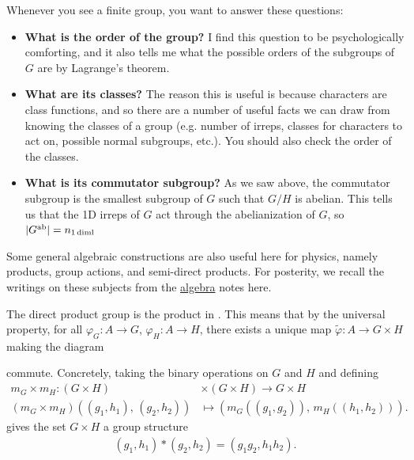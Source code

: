 \documentclass[11pt]{article}
\begin{document}
\begin{iidea}
    Whenever you see a finite group, you want to answer these questions:
    \begin{itemize}
        \item \textbf{What is the order of the group?} I find this question to be 
        psychologically comforting, and it also tells me what the possible 
        orders of the subgroups of $G$ are by Lagrange's theorem.
        \item \textbf{What are its classes?} The reason this is useful is because
        characters are class functions, and so there are a number of useful facts we can
        draw from knowing the classes of a group (e.g. number of irreps,
        classes for characters to act on, possible normal subgroups, etc.).
        You should also check the order of the classes.
        \item \textbf{What is its commutator subgroup?} As we saw above, the commutator
        subgroup is the smallest subgroup of $G$ such that $G/H$ is abelian.
        This tells us that the 1D irreps of $G$ act through the abelianization 
        of $G$, so $|G^{\rm ab}| = n_{1 \, \rm{diml}}$
    \end{itemize}
\end{iidea}

Some general algebraic constructions are also useful here
for physics, namely products, group actions, and semi-direct products.
For posterity, we recall the writings on these subjects from the 
\href{https://github.com/will-lancer/notes/blob/main/Mathematics/coreMath/coreMath.pdf}{algebra} 
notes here.

The direct product group is the product in . This means that by 
the universal property, for all $\varphi_G \colon A \to G$, $\varphi_{H} \colon A \to H$,
there exists a unique map $\widetilde{\varphi} \colon A \to G \times H$
making the diagram

\begin{center}
\end{center}

\noin
commute. Concretely, taking the binary operations on $G$
and $H$ and defining 
\begin{align*}
    m_G \times m_H \colon (G \times H) & \times (G \times H) \to G \times H\\
    (m_G \times m_H)((g_1, h_1), \, (g_2, h_2)) & \mapsto (m_G((g_1, g_2)), \, m_H((h_1, h_2))).
\end{align*}
gives the set $G \times H$ a group structure
\begin{align*}
    (g_1, h_1) * (g_2, h_2) = (g_1 g_2, h_1 h_2).
\end{align*}
\end{document}
